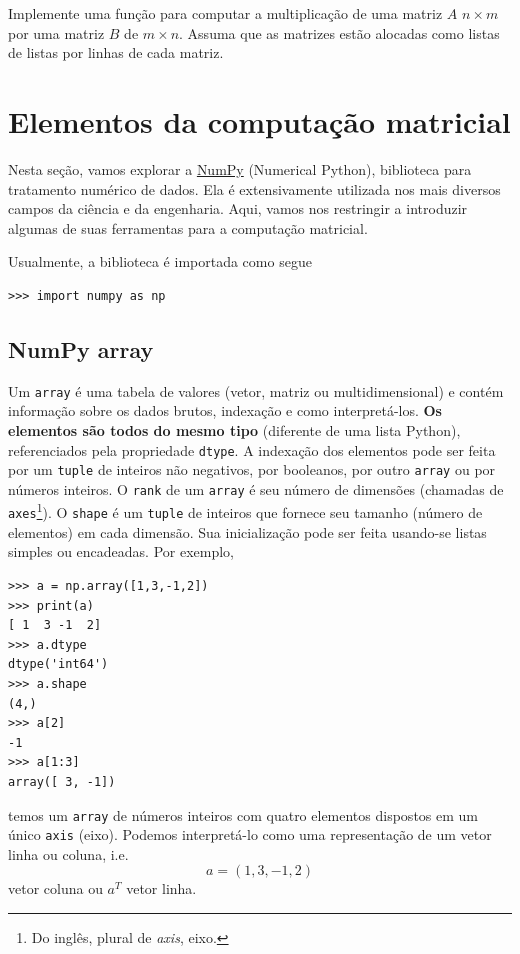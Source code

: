 \documentclass[12pt]{article}
\begin{document}
\begin{exr}
  Implemente uma função para computar a multiplicação de uma matriz $A$ $n\times m$ por uma matriz $B$ de $m\times n$. Assuma que as matrizes estão alocadas como listas de listas por linhas de cada matriz.
\end{exr}

\section{Elementos da computação matricial}\label{sec_mat}

Nesta seção, vamos explorar a \href{https://numpy.org/}{NumPy} (Numerical Python), biblioteca para tratamento numérico de dados. Ela é extensivamente utilizada nos mais diversos campos da ciência e da engenharia. Aqui, vamos nos restringir a introduzir algumas de suas ferramentas para a computação matricial.

Usualmente, a biblioteca é importada como segue
\begin{lstlisting}
>>> import numpy as np
\end{lstlisting}

\subsection{NumPy array}

Um \lstinline+array+ é uma tabela de valores (vetor, matriz ou multidimensional) e contém informação sobre os dados brutos, indexação e como interpretá-los. {\bf Os elementos são todos do mesmo tipo} (diferente de uma lista Python), referenciados pela propriedade \lstinline+dtype+. A indexação dos elementos pode ser feita por um \lstinline+tuple+ de inteiros não negativos, por booleanos, por outro \lstinline+array+ ou por números inteiros. O \lstinline+rank+ de um \lstinline+array+ é seu número de dimensões (chamadas de \lstinline+axes+\footnote{Do inglês, plural de {\it axis}, eixo.}). O \lstinline+shape+ é um \lstinline+tuple+ de inteiros que fornece seu tamanho (número de elementos) em cada dimensão. Sua inicialização pode ser feita usando-se listas simples ou encadeadas. Por exemplo,
\begin{lstlisting}
>>> a = np.array([1,3,-1,2])
>>> print(a)
[ 1  3 -1  2]
>>> a.dtype
dtype('int64')
>>> a.shape
(4,)
>>> a[2]
-1
>>> a[1:3]
array([ 3, -1])
\end{lstlisting}
temos um \lstinline+array+ de números inteiros com quatro elementos dispostos em um único \lstinline+axis+ (eixo). Podemos interpretá-lo como uma representação de um vetor linha ou coluna, i.e.
\begin{equation}
  a = (1, 3, -1, 2)
\end{equation}
vetor coluna ou $a^T$ vetor linha.
\end{document}
